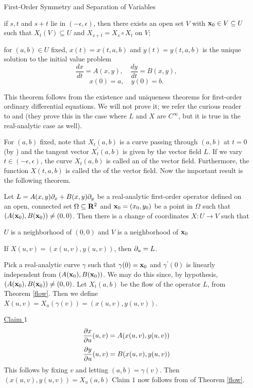 \begin{section}{First-Order Symmetry and Separation of Variables}
\begin{theorem}
\noindent {} if $s,t$ and $s+t$ lie in $(-\epsilon,\epsilon)$, then there exists an open set $V$ with $\mathbf{x}_0 \in V \subseteq U$ such that $X_t(V) \subseteq U$ and $X_{s+t} = X_s \circ X_t$ on $V$;

\noindent {} for $(a,b) \in U$ fixed, $x(t) = x(t,a,b)$ and $y(t) = y(t,a,b)$ is the unique solution to the initial value problem
\[
\frac{d x}{d t} = A(x,y), \quad \frac{d y}{d t} = B(x,y),
\]
\[
x(0) = a, \quad y(0) = b.
\]
\end{theorem}

This theorem follows from the existence and uniqueness theorems for first-order ordinary differential equations.  We will not prove it; we refer the curious reader to \cite[pp.~28-29]{hurewicz} and \cite[pp.~37-38]{warner} (they prove this in the case where $L$ and $X$ are $C^\infty$, but it is true in the real-analytic case as well).

For $(a,b)$ fixed, note that $X_t(a,b)$ is a curve passing through $(a,b)$ at $t = 0$ (by ) and the tangent vector $X_t^\prime (a,b)$ is given by the vector field $L$.  If we vary $t \in (-\epsilon,\epsilon)$, the curve $X_t(a,b)$ is called an  of the vector field.  Furthermore, the function $X(t,a,b)$ is called the  of the vector field.  Now the important result is the following theorem.

\begin{theorem}
\label{p u flow}
Let $L = A(x,y)\partial_{x} + B(x,y)\partial_{y}$ be a real-analytic first-order operator defined on an open, connected set $\Omega \subseteq \mathbf{R}^2$ and $\mathbf{x}_0 = (x_0,y_0)$ be a point in $\Omega$ such that $(A(\mathbf{x}_0),B(\mathbf{x}_0)) \not= (0,0)$.  Then there is a change of coordinates $X: U \longrightarrow  V$ such that

\noindent {} $U$ is a neighborhood of $(0,0)$ and $V$ is a neighborhood of $\mathbf{x}_0$

\noindent {} If $X(u,v) = (x(u,v),y(u,v))$, then $\partial_{u} = L$.
\end{theorem}

\proof
Pick a real-analytic curve $\gamma$ such that $\gamma(0) = \mathbf{x}_0$ and $\gamma^\prime(0)$ is linearly independent from $(A(\mathbf{x}_0),B(\mathbf{x}_0))$.  We may do this since, by hypothesis, $(A(\mathbf{x}_0),B(\mathbf{x}_0)) \not= (0,0)$.  Let $X_t(a,b)$ be the flow of the operator $L$, from Theorem \ref{flow}.  Then we define $X(u,v) = X_u(\gamma(v)) = (x(u,v),y(u,v))$.

\noindent \underline{Claim $1$}
\[
\frac{\partial x}{\partial u}(u,v) = A(x(u,v),y(u,v))
\]
\[
\frac{\partial y}{\partial u}(u,v) = B(x(u,v),y(u,v))
\]
This follows by fixing $v$ and letting $(a,b) = \gamma(v)$.  Then $(x(u,v),y(u,v)) = X_u(a,b)$ Claim $1$ now follows from  of Theorem \ref{flow}.


\end{section}
